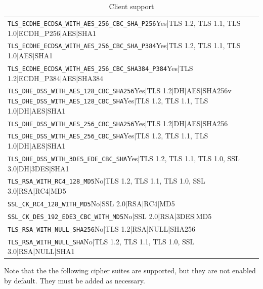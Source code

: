 \begin{table}[h]
\begin{tabular}{ll}
\verb |TLS_ECDHE_ECDSA_WITH_AES_256_CBC_SHA_P256|Yes|TLS 1.2, TLS 1.1, TLS 1.0|ECDH_P256|AES|SHA1\\
\verb |TLS_ECDHE_ECDSA_WITH_AES_256_CBC_SHA_P384|Yes|TLS 1.2, TLS 1.1, TLS 1.0|AES|SHA1\\
\verb |TLS_ECDHE_ECDSA_WITH_AES_256_CBC_SHA384_P384|Yes|TLS 1.2|ECDH_P384|AES|SHA384\\
\verb |TLS_DHE_DSS_WITH_AES_128_CBC_SHA256|Yes|TLS 1.2|DH|AES|SHA256v
\verb |TLS_DHE_DSS_WITH_AES_128_CBC_SHA|Yes|TLS 1.2, TLS 1.1, TLS 1.0|DH|AES|SHA1\\
\verb |TLS_DHE_DSS_WITH_AES_256_CBC_SHA256|Yes|TLS 1.2|DH|AES|SHA256\\
\verb |TLS_DHE_DSS_WITH_AES_256_CBC_SHA|Yes|TLS 1.2, TLS 1.1, TLS 1.0|DH|AES|SHA1\\
\verb |TLS_DHE_DSS_WITH_3DES_EDE_CBC_SHA|Yes|TLS 1.2, TLS 1.1, TLS 1.0, SSL 3.0|DH|3DES|SHA1\\
\verb |TLS_RSA_WITH_RC4_128_MD5|No|TLS 1.2, TLS 1.1, TLS 1.0, SSL 3.0|RSA|RC4|MD5\\
\verb |SSL_CK_RC4_128_WITH_MD5|No|SSL 2.0|RSA|RC4|MD5\\
\verb |SSL_CK_DES_192_EDE3_CBC_WITH_MD5|No|SSL 2.0|RSA|3DES|MD5\\
\verb |TLS_RSA_WITH_NULL_SHA256|No|TLS 1.2|RSA|NULL|SHA256\\
\verb |TLS_RSA_WITH_NULL_SHA|No|TLS 1.2, TLS 1.1, TLS 1.0, SSL 3.0|RSA|NULL|SHA1\\
 \bottomrule 
 \end{tabular}
  \caption{Client support}
  \label{tab:MS_IIS_Client_Support}
\end{table}
Note that the the following cipher suites are supported, but they are not enabled by default.
They must be added as necessary. 

